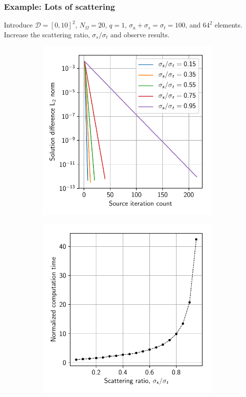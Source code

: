\documentclass[xcolor={usenames,dvipsnames,svgnames,table}]{beamer}
\newcommand{\spatial}{\mathcal{D}} %
\begin{document}
\begin{frame}\frametitle{Example: Lots of scattering}
	Introduce $\spatial = [0, 10]^2$, $N_\Omega = 20$, $q = 1$, $\sigma_a + \sigma_s = \sigma_t = 100$, and $64^2$ elements. Increase the scattering ratio, $\sigma_s / \sigma_t$ and observe results.

	\begin{figure}[H]
		\centering
		\begin{subfigure}[t]{0.48\textwidth}
				\includegraphics[width=\linewidth]{plots/scattering_norms}
		\end{subfigure}
		\begin{subfigure}[t]{0.48\textwidth}
			\includegraphics[width=\linewidth]{plots/scattering_times}
		\end{subfigure}
	\end{figure}
\end{frame}
\end{document}

